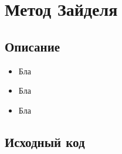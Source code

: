 \documentclass[../../report.tex]{subfiles}
\begin{document}
\chapter{Метод Зайделя}

\section{Описание}
\begin{itemize}
    \item Бла
    \item Бла
    \item Бла
\end{itemize}

\section{Исходный код}
\end{document}
